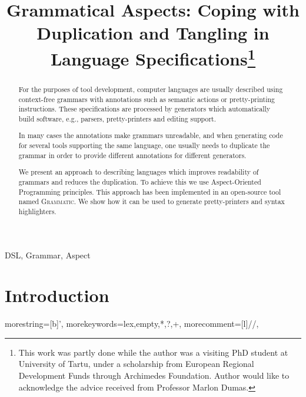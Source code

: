 \documentclass{IOS-Book-Article}     %
\newcommand{\tool}[1]{\textsc{#1}}
\newcommand{\Grammatic}[0]{\tool{Grammatic}}
\begin{document}
\begin{frontmatter}          %
%
\title{Grammatical Aspects: Coping with Duplication and Tangling in Language Specifications\thanks{This work was partly done while the author was a visiting PhD student at University of Tartu, under a scholarship from European Regional Development Funds through Archimedes Foundation. Author would like to acknowledge the advice received from Professor Marlon Dumas.}}

\author{ }
\address{ITMO University, Saint-Petersburg, Russia}
%
\begin{abstract}
	For the purposes of tool development, computer languages are usually described using context-free grammars with annotations such as semantic actions or pretty-printing instructions. 
	These specifications are processed by generators which automatically build software, e.g., parsers, pretty-printers and editing support.

	In many cases the annotations make grammars unreadable, and when generating code for several tools supporting the same language, one usually needs to duplicate the grammar in order to provide different annotations for different generators.

	We present an approach to describing languages which improves readability of grammars and reduces the duplication. To achieve this we use Aspect-Oriented Programming principles. This approach has been implemented in an open-source tool named \Grammatic{}. We show how it can be used to generate pretty-printers and syntax highlighters.
\end{abstract}

\begin{keyword}
DSL, Grammar, Aspect
\end{keyword}

\end{frontmatter}

\section*{Introduction}

	{
		morestring=[b]',
		morekeywords={lex,empty,*,?,+},
		morecomment=[l]{//},
	}
\end{document}
